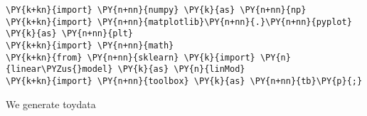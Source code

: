 












    
    
    


{\par%
\vspace{-1\baselineskip}%
}%
\begin{notebookcell}[]%
\begin{addmargin}[\cellleftmargin]{0em}%
{\smaller%
\par%
%
\vspace{-1\smallerfontscale}%
\begin{Verbatim}[commandchars=\\\{\}]
\PY{k+kn}{import} \PY{n+nn}{numpy} \PY{k}{as} \PY{n+nn}{np}
\PY{k+kn}{import} \PY{n+nn}{matplotlib}\PY{n+nn}{.}\PY{n+nn}{pyplot} \PY{k}{as} \PY{n+nn}{plt}
\PY{k+kn}{import} \PY{n+nn}{math}
\PY{k+kn}{from} \PY{n+nn}{sklearn} \PY{k}{import} \PY{n}{linear\PYZus{}model} \PY{k}{as} \PY{n}{linMod}
\PY{k+kn}{import} \PY{n+nn}{toolbox} \PY{k}{as} \PY{n+nn}{tb}\PY{p}{;}
\end{Verbatim}
%
\par%
\vspace{-1\smallerfontscale}}%
\end{addmargin}
\end{notebookcell}


    We generate toydata


